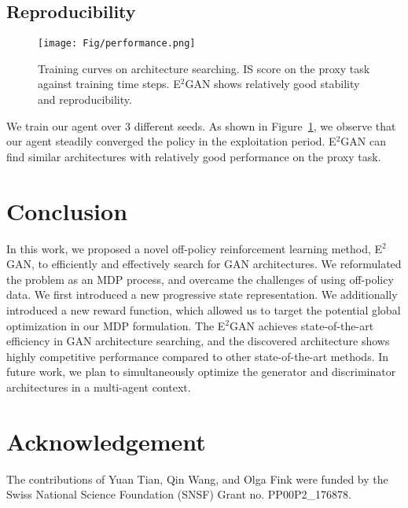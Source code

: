 \documentclass[runningheads]{llncs}
\begin{document}
\subsection{Reproducibility}
\begin{figure}[t!]
    \centering
    \texttt{[image: Fig/performance.png]}
    \caption{Training curves on architecture searching.  IS score on the proxy task against training time steps. E$^2$GAN shows relatively good stability and reproducibility.}
\label{fig:reproducibility}
\end{figure}
We train our agent over 3 different seeds. As shown in Figure~\ref{fig:reproducibility}, we observe that our agent steadily  converged the policy in the exploitation period. E$^2$GAN can find similar architectures with relatively good performance on the proxy task. 

\section{Conclusion}
In this work, we proposed a novel off-policy reinforcement learning method, E$^2$GAN, to efficiently and effectively search for GAN architectures. We reformulated the problem as an MDP process, and overcame the challenges of using off-policy data. We first introduced a new progressive state representation. We additionally introduced a new reward function, which allowed us to target the potential global optimization in our MDP formulation. The E$^2$GAN achieves state-of-the-art efficiency in GAN architecture searching, and the discovered architecture shows highly competitive performance compared to other state-of-the-art methods. In future work, we plan to simultaneously optimize the generator and discriminator architectures in a multi-agent context.


\clearpage
\section*{Acknowledgement}
The contributions of Yuan Tian, Qin Wang, and Olga Fink were funded by the Swiss National Science Foundation (SNSF) Grant no. PP00P2\_176878.



\end{document}
